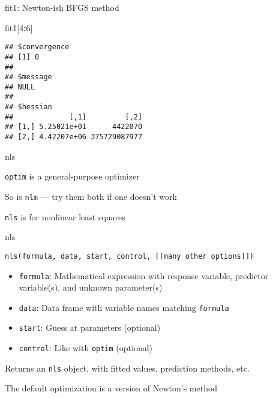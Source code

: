 \documentclass[8pt,ignorenonframetext,]{beamer}
\newenvironment{Shaded}{\begin{snugshade}}{\end{snugshade}}
\newcommand{\DecValTok}[1]{\textcolor[rgb]{0.00,0.00,0.81}{#1}}
\newcommand{\OperatorTok}[1]{\textcolor[rgb]{0.81,0.36,0.00}{\textbf{#1}}}
\newcommand{\NormalTok}[1]{#1}
\providecommand{\tightlist}{%
  \setlength{\itemsep}{0pt}\setlength{\parskip}{0pt}}
\begin{document}
\begin{frame}[fragile]{fit1: Newton-ish BFGS method}

\begin{Shaded}
\begin{Highlighting}[]
\NormalTok{fit1[}\DecValTok{4}\OperatorTok{:}\DecValTok{6}\NormalTok{]}
\end{Highlighting}
\end{Shaded}

\begin{verbatim}
## $convergence
## [1] 0
## 
## $message
## NULL
## 
## $hessian
##             [,1]         [,2]
## [1,] 5.25021e+01      4422070
## [2,] 4.42207e+06 375729087977
\end{verbatim}

\end{frame}

\begin{frame}[fragile]{nls}

\texttt{optim} is a general-purpose optimizer

So is \texttt{nlm} --- try them both if one doesn't work

\texttt{nls} is for nonlinear least squares

\end{frame}

\begin{frame}[fragile]{nls}

\begin{verbatim}
nls(formula, data, start, control, [[many other options]])
\end{verbatim}

\begin{itemize}
\tightlist
\item
  \texttt{formula}: Mathematical expression with response variable,
  predictor variable(s), and unknown parameter(s)
\item
  \texttt{data}: Data frame with variable names matching
  \texttt{formula}
\item
  \texttt{start}: Guess at parameters (optional)
\item
  \texttt{control}: Like with \texttt{optim} (optional)
\end{itemize}

Returns an \texttt{nls} object, with fitted values, prediction methods,
etc.

The default optimization is a version of Newton's method

\end{frame}
\end{document}
